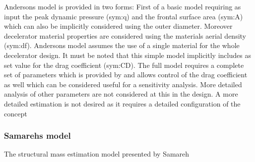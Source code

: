 Andersons model is provided in two forms: First of a basic model requiring as input the peak dynamic pressure (\gls{sym:q}) and the frontal surface area (\gls{sym:A}) which can also be implicitly considered using the outer diameter. Moreover decelerator material properties are considered using the materials aerial density (\gls{sym:df}). Andersons model assumes the use of a single material for the whole decelerator design. It must be noted that this simple model implicitly includes as set value for the drag coefficient (\gls{sym:CD}). The full model requires a complete set of parameters which is provided by \cite{Anderson1969} and allows control of the drag coefficient as well which can be considered useful for a sensitivity analysis. More detailed analysis of other parameters are not considered at this in the design. A more detailed estimation is not desired as it requires a detailed configuration of the concept

\subsubsection{Samarehs model}

The structural mass estimation model presented by Samareh 